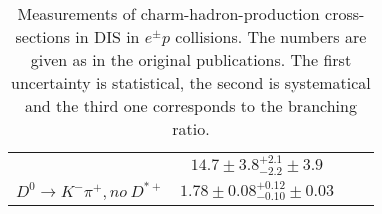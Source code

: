 {\begin{table}[htbp]
\begin{tabular}{|c|c|c|c|}
											&$14.7 \pm 3.8 {}^{+2.1}_{-2.2}\pm 3.9$  
											&  \\
$D^{0}\rightarrow K^-\pi^+,no\ D^{*+}$   
											& $1.78\pm 0.08^{+0.12}_{-0.10}\pm 0.03$   
											&                                                                  
											&\\\hline
\end{tabular}
\caption{
Measurements of charm-hadron-production cross-sections in DIS in $e^{\pm}p$ collisions.
The numbers are given as in the original publications.
The first uncertainty is statistical, the second is systematical and the third one corresponds to the branching ratio.
}
\label{tab:DISmeas}
\end{table}
}


\newcommand{\tabDISaverage}{
\begin{table}[htbp]\small\centering
\begin{tabular}{|c|c|}\hline
         &    Constrained $S$ \\\hline\hline

\end{tabular}
\caption{Average of charm-quark fragmentation fractions in $e^{\pm}p$ collisions in DIS.
 The quantities $S$, $R_{u/d}$, $P^d_{V}$ and 
$\gamma_s$ are recalculated from the fit results taking into account correlation of fit parameters.
The value of minimized $\chi^2$  and the number degrees of freedom of the fit $n_{\text{dof}}$ are given as well.}
\label{tab:DISaverage}
\end{table}
}







